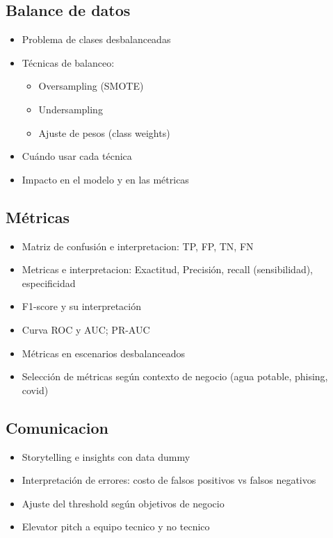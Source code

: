 \documentclass[12pt,a4paper,openany,oneside]{book}
\begin{document}
\begin{itemize}
\subsection{Balance de datos}
\begin{itemize}
    \item Problema de clases desbalanceadas
    \item Técnicas de balanceo:
    \begin{itemize}
        \item Oversampling (SMOTE)
        \item Undersampling
        \item Ajuste de pesos (class weights)
    \end{itemize}
    \item Cuándo usar cada técnica
    \item Impacto en el modelo y en las métricas
\end{itemize}

\subsection{Métricas}
\begin{itemize}
    \item Matriz de confusión e interpretacion: TP, FP, TN, FN 
    \item Metricas e interpretacion: Exactitud, Precisión, recall (sensibilidad), especificidad
    \item F1-score y su interpretación
    \item Curva ROC y AUC; PR-AUC
    \item Métricas en escenarios desbalanceados
    \item Selección de métricas según contexto de negocio (agua potable, phising, covid)
\end{itemize}

\subsection{Comunicacion}
\begin{itemize}
    \item Storytelling e insights con data dummy
    \item Interpretación de errores: costo de falsos positivos vs falsos negativos
    \item Ajuste del threshold según objetivos de negocio
    \item Elevator pitch a equipo tecnico y no tecnico
\end{itemize}


\end{itemize}
\end{document}

